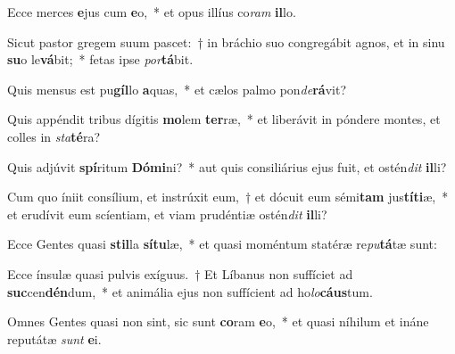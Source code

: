 \item Ecce merces \textbf{e}jus cum \textbf{e}o,~* et opus illíus co\textit{ram} \textbf{il}lo.
\item Sicut pastor gregem suum pascet:~† in bráchio suo congregábit agnos, et in sinu \textbf{su}o le\textbf{vá}bit;~* fetas ipse \textit{por}\textbf{tá}bit.
\item Quis mensus est pu\textbf{gíl}lo \textbf{a}quas,~* et cælos palmo pon\textit{de}\textbf{rá}vit?
\item Quis appéndit tribus dígitis \textbf{mo}lem \textbf{ter}ræ,~* et liberávit in póndere montes, et colles in \textit{sta}\textbf{té}ra?
\item Quis adjúvit \textbf{spí}ritum \textbf{Dó}\textbf{mi}ni?~* aut quis consiliárius ejus fuit, et ostén\textit{dit} \textbf{il}li?
\item Cum quo íniit consílium, et instrúxit eum,~† et dócuit eum sémi\textbf{tam} jus\textbf{tí}\textbf{ti}æ,~* et erudívit eum scíentiam, et viam prudéntiæ ostén\textit{dit} \textbf{il}li?
\item Ecce Gentes quasi \textbf{stil}la \textbf{sí}\textbf{tu}læ,~* et quasi moméntum statéræ re\textit{pu}\textbf{tá}tæ sunt:
\item Ecce ínsulæ quasi pulvis exíguus.~† Et Líbanus non suffíciet ad \textbf{suc}cen\textbf{dén}dum,~* et animália ejus non suffícient ad ho\textit{lo}\textbf{cáus}tum.
\item Omnes Gentes quasi non sint, sic sunt \textbf{co}ram \textbf{e}o,~* et quasi níhilum et ináne reputátæ \textit{sunt} \textbf{e}i.
